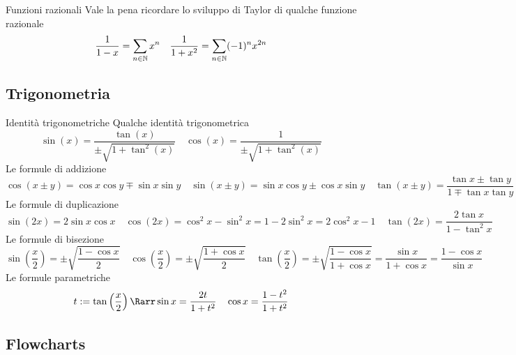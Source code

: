 \documentclass{article}
\begin{document}
\begin{example}{Funzioni razionali}{}
    Vale la pena ricordare lo sviluppo di Taylor di qualche funzione razionale
    \[\frac{1}{1-x} = \sum_{n\in\mathbb{N}} x^n \quad \frac{1}{1+x^2} = \sum_{n\in\mathbb{N}} (-1)^n x^{2n}\]
\end{example}

\subsection{Trigonometria}

\begin{example}{Identità trigonometriche}{}
    Qualche identità trigonometrica 
    \[\sin(x) = \frac{\tan(x)}{\pm\sqrt{1+\tan^2(x)}} \quad \cos(x) = \frac{1}{\pm\sqrt{1+\tan^2(x)}}\]
    Le formule di addizione
    \[\cos(x\pm y) = \cos x \cos y \mp \sin x \sin y \quad \sin(x\pm y) = \sin x \cos y \pm \cos x \sin y \quad \tan(x \pm y) = \frac{\tan x \pm \tan y}{1 \mp \tan x \tan y}\]
    Le formule di duplicazione
    \[\sin(2x) = 2\sin x \cos x \quad \cos(2x) = \cos^2 x - \sin^2 x = 1-2\sin^2 x = 2\cos^2 x -1 \quad \tan(2x) = \frac{2\tan x}{1- \tan^2 x}\]
    Le formule di bisezione
    \[\sin\left(\frac{x}{2}\right) = \pm\sqrt{\frac{1-\cos x}{2}} \quad \cos\left(\frac{x}{2}\right) = \pm\sqrt{\frac{1+\cos x}{2}} \quad \tan\left(\frac{x}{2}\right) = \pm\sqrt{\frac{1-\cos x}{1+\cos x}} = \frac{\sin x}{1 + \cos x} = \frac{1 - \cos x}{\sin x}\]
    Le formule parametriche
    \[t := \tan \left(\frac{x}{2}\right) \Rarr \sin x = \frac{2 t}{1 + t^2} \quad \cos x = \frac{1 - t^2}{1+t^2}\]
\end{example}

\subsection{Flowcharts}
\end{document}
